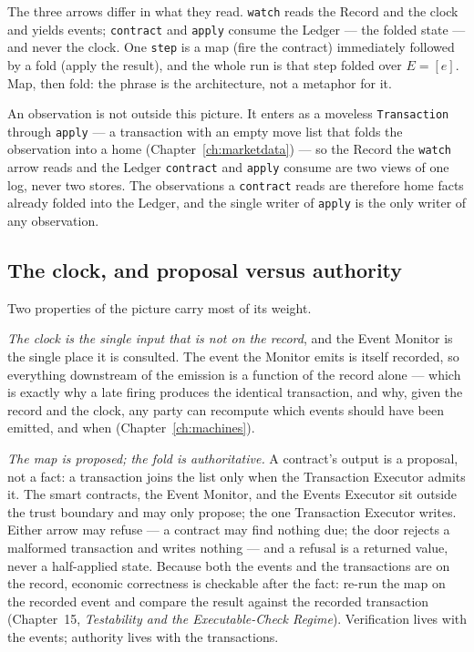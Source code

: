 \documentclass[11pt,a4paper]{article}
\begin{document}
The three arrows differ in what they read. \texttt{watch} reads the Record and the clock
and yields events; \texttt{contract} and \texttt{apply} consume the Ledger --- the folded
state --- and never the clock. One \texttt{step} is a map (fire the contract) immediately
followed by a fold (apply the result), and the whole run is that step folded over
$E=[e]$. Map, then fold: the phrase is the architecture, not a metaphor for it.

An observation is not outside this picture. It enters as a moveless
\texttt{Transaction} through \texttt{apply} --- a transaction with an empty move list
that folds the observation into a home (Chapter~\ref{ch:marketdata}) --- so the Record
the \texttt{watch} arrow reads and the Ledger \texttt{contract} and \texttt{apply}
consume are two views of one log, never two stores. The observations a \texttt{contract}
reads are therefore home facts already folded into the Ledger, and the single writer of
\texttt{apply} is the only writer of any observation.

\subsection{The clock, and proposal versus authority}

Two properties of the picture carry most of its weight.

\emph{The clock is the single input that is not on the record}, and the Event Monitor is
the single place it is consulted. The event the Monitor emits is itself recorded, so
everything downstream of the emission is a function of the record alone --- which is
exactly why a late firing produces the identical transaction, and why, given the record
and the clock, any party can recompute which events should have been emitted, and when
(Chapter~\ref{ch:machines}).

\emph{The map is proposed; the fold is authoritative.} A contract's output is a proposal,
not a fact: a transaction joins the list only when the Transaction Executor admits it. The
smart contracts, the Event Monitor, and the Events Executor sit outside the trust boundary
and may only propose; the one Transaction Executor writes. Either arrow may refuse --- a
contract may find nothing due; the door rejects a malformed transaction and writes nothing
--- and a refusal is a returned value, never a half-applied state. Because both the events
and the transactions are on the record, economic correctness is checkable after the fact:
re-run the map on the recorded event and compare the result against the recorded
transaction (Chapter~15, \emph{Testability and the Executable-Check Regime}). Verification
lives with the events; authority lives with the transactions.
\end{document}
